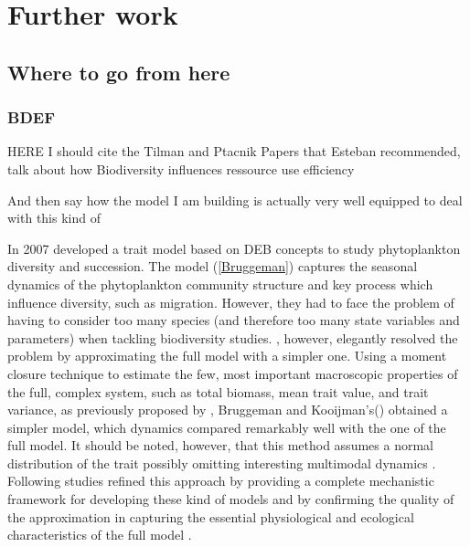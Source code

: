 \chapter {Further work}

\section{Where to go from here}

\subsection{BDEF}

 HERE I should cite the Tilman and Ptacnik Papers that Esteban recommended, talk about how Biodiversity influences ressource use efficiency
 
 And then say how the model I am building is actually very well equipped to deal with this kind of 


In 2007 \citet{Bruggeman2007} developed a trait model based on DEB concepts to study phytoplankton diversity and succession. The model (\ref{Bruggeman}) captures the seasonal dynamics of the phytoplankton community structure and key process which influence diversity, such as migration. However, they had to face the problem of having to consider too many species (and therefore too many state variables and parameters) when tackling biodiversity studies. \citet{Bruggeman2007}, however, elegantly resolved the problem by approximating the full model with a simpler one. Using a moment closure technique to estimate the few, most important macroscopic properties of the full, complex system, such as total biomass, mean trait value, and trait variance, as previously proposed by \citet{Wirtz1996, Norberg2001}, Bruggeman and Kooijman's(\citeyear{Bruggeman2007}) obtained a simpler model, which dynamics compared remarkably well with the one of the full model. It should be noted, however, that this method assumes a normal distribution of the trait possibly omitting interesting multimodal dynamics \citep{Bruggeman2007}. Following studies refined this approach by providing a complete mechanistic framework for developing these kind of models and by confirming the quality of the approximation in capturing the essential physiological and ecological characteristics of the full model \citep{Merico2009}. 

